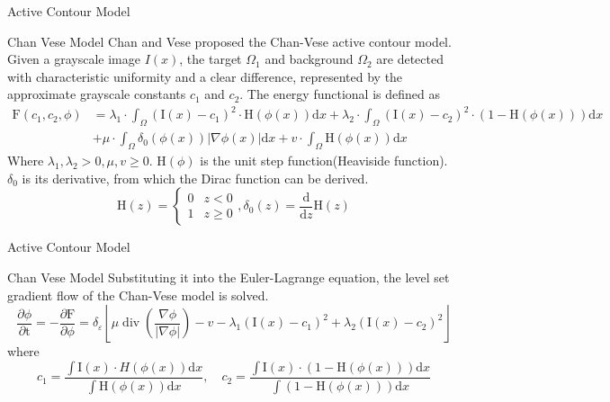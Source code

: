 \begin{frame}{Active Contour Model}
	\begin{block}{Chan Vese Model}
		Chan and Vese proposed the Chan-Vese active contour model. Given a grayscale image $I(x)$, the target $\Omega_1$ and background $\Omega_2$ are detected with characteristic uniformity and a clear difference, represented by the approximate grayscale constants $c_1$ and $c_2$. The energy functional is defined as
		\begin{equation}
			\begin{aligned}
				\mathrm{F}\left(c_1, c_2, \phi\right) & =\lambda_1 \cdot \int_{\Omega}\left(\mathrm{I}(x)-c_1\right)^2 \cdot \mathrm{H}(\phi(x)) \mathrm{d} x+\lambda_2 \cdot \int_{\Omega}\left(\mathrm{I}(x)-c_2\right)^2 \cdot(1-\mathrm{H}(\phi(x))) \mathrm{d} x \\
				& +\mu \cdot \int_{\Omega} \delta_0(\phi(x))|\nabla \phi(x)| \mathrm{d} x+v \cdot \int_{\Omega} \mathrm{H}(\phi(x)) \mathrm{d} x
			\end{aligned}
		\end{equation}
		Where $\lambda_1,\lambda_2>0,\mu,v\geq0$. $\mathrm{H}(\phi)$ is the unit step function(Heaviside function). $\delta_0$ is its derivative, from which the Dirac function can be derived.
		\begin{equation}
			\mathrm{H}(z)=\left\{\begin{array}{ll}
				0 & z<0 \\
				1 & z \geq 0
			\end{array}, \delta_0(z)=\frac{\mathrm{d}}{\mathrm{d} z} \mathrm{H}(z)\right.
		\end{equation}
	\end{block}
\end{frame}

\begin{frame}{Active Contour Model}
	\begin{block}{Chan Vese Model}
		Substituting it into the Euler-Lagrange equation, the level set gradient flow of the Chan-Vese model is solved.
		\begin{equation}
			\frac{\partial \phi}{\partial \mathrm{t}}=-\frac{\partial \mathrm{F}}{\partial \phi}=\delta_{\varepsilon}\left\lfloor\mu \operatorname{div}\left(\frac{\nabla \phi}{|\nabla \phi|}\right)-v-\lambda_1\left(\mathrm{I}(x)-c_1\right)^2+\lambda_2\left(\mathrm{I}(x)-c_2\right)^2\right\rfloor
		\end{equation}
		where
		\begin{equation}
			c_1=\frac{\int \mathrm{I}(x) \cdot H(\phi(x)) \mathrm{d} x}{\int \mathrm{H}(\phi(x)) \mathrm{d} x}, \quad c_2=\frac{\int \mathrm{I}(x) \cdot(1-\mathrm{H}(\phi(x))) \mathrm{d} x}{\int(1-\mathrm{H}(\phi(x))) \mathrm{d} x}
		\end{equation}
	\end{block}
\end{frame}

